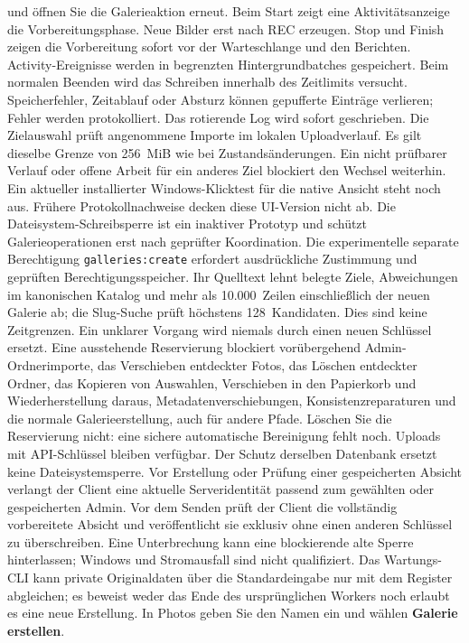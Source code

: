 \documentclass[11pt,a4paper]{article}
\newcommand{\ui}[1]{\textbf{#1}}
\begin{document}
und öffnen Sie die Galerieaktion erneut. Beim Start zeigt eine
Aktivitätsanzeige die Vorbereitungsphase. Neue Bilder erst nach REC erzeugen.
Stop und Finish zeigen die Vorbereitung sofort vor der Warteschlange und
den Berichten. Activity-Ereignisse werden in begrenzten Hintergrundbatches
gespeichert. Beim normalen Beenden wird das Schreiben innerhalb des Zeitlimits
versucht. Speicherfehler, Zeitablauf oder Absturz können gepufferte Einträge
verlieren; Fehler werden protokolliert. Das rotierende Log wird sofort
geschrieben. Die Zielauswahl prüft
angenommene Importe im lokalen Uploadverlauf. Es gilt dieselbe Grenze von
256~MiB wie bei Zustandsänderungen. Ein nicht prüfbarer Verlauf oder offene
Arbeit für ein anderes Ziel blockiert den Wechsel weiterhin. Ein
aktueller installierter Windows-Klicktest für die native Ansicht steht noch
aus. Frühere Protokollnachweise decken diese UI-Version nicht ab.
Die Dateisystem-Schreibsperre ist ein inaktiver Prototyp und schützt
Galerieoperationen erst nach geprüfter Koordination.
Die experimentelle separate Berechtigung \texttt{galleries:create} erfordert
ausdrückliche Zustimmung und geprüften Berechtigungsspeicher. Ihr Quelltext
lehnt belegte Ziele, Abweichungen im kanonischen
Katalog und mehr als 10.000~Zeilen einschließlich der neuen Galerie ab;
die Slug-Suche prüft höchstens 128~Kandidaten. Dies sind keine Zeitgrenzen.
Ein unklarer Vorgang wird niemals durch einen neuen Schlüssel ersetzt.
Eine ausstehende Reservierung blockiert vorübergehend Admin-Ordnerimporte,
das Verschieben entdeckter Fotos, das Löschen entdeckter Ordner, das Kopieren
von Auswahlen, Verschieben in den Papierkorb und Wiederherstellung daraus,
Metadatenverschiebungen,
Konsistenzreparaturen und die normale
Galerieerstellung, auch für andere Pfade. Löschen Sie die
Reservierung nicht: eine sichere automatische Bereinigung fehlt noch. Uploads
mit API-Schlüssel bleiben verfügbar. Der Schutz derselben Datenbank ersetzt
keine Dateisystemsperre.
Vor Erstellung oder Prüfung einer gespeicherten Absicht verlangt der Client
eine aktuelle Serveridentität passend zum gewählten oder gespeicherten Admin.
Vor dem Senden prüft der Client die vollständig vorbereitete Absicht und
veröffentlicht sie exklusiv ohne einen anderen Schlüssel zu überschreiben.
Eine Unterbrechung kann eine blockierende alte Sperre hinterlassen; Windows
und Stromausfall sind nicht qualifiziert.
Das Wartungs-CLI kann private Originaldaten über die Standardeingabe nur mit
dem Register abgleichen; es beweist weder das Ende des ursprünglichen Workers
noch erlaubt es eine neue Erstellung.
In Photos geben Sie den Namen ein und wählen \ui{Galerie erstellen}.
\end{document}
